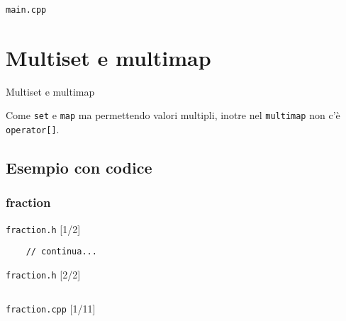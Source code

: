 \documentclass[xcolor={dvipsnames, svgnames, x11names, table}, 10pt]{beamer}
\begin{document}
\begin{frame}{\texttt{main.cpp}}
    
    
\end{frame}

\section{Multiset e multimap}

\begin{frame}[fragile]{Multiset e multimap}

Come \texttt{set} e \texttt{map} ma permettendo valori multipli, inotre nel \texttt{multimap} non c'è \texttt{operator[]}.

\end{frame}

\subsection{Esempio con codice}

\subsubsection{fraction}

\begin{frame}[fragile]{\texttt{fraction.h} [1/2]}

    
    \begin{verbatim}
    // continua...
    \end{verbatim}
    
\end{frame}

\begin{frame}{\texttt{fraction.h} [2/2]}

\begin{columns}
    \column{\dimexpr\paperwidth-30pt}
\end{columns}

\end{frame}

\begin{frame}{\texttt{fraction.cpp} [1/11]}
    
    
\end{frame}
\end{document}
